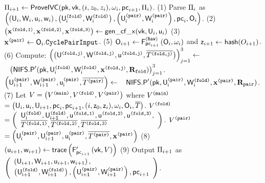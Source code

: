 \begin{small}
\begin{algorithm}[bt]
$ \ivcprf_{i+1} \leftarrow \ProveIVC(\pk, \vk, (i, z_0, z_i), \omega_i, \pc_{i+1}, 
	\ivcprf_i)$. \newline
(1) Parse $\ivcprf_i$ as $\left(
		\left(\U_i, \W_i, \u_i, \w_i\right), 
		\left(\Uc{i}, \Wc{i}\right), 
		\left(\Upair{i}, \Wpair{i}\right),
		\pc_i, \O_i
	\right)$. \newline
(2) $\left(\xin{fold}{1},\xin{fold}{2},\xin{fold}{3}\right) 
		\leftarrow \genCycleFoldX(\vk, \U_i, \u_i) $ \newline
(3) $\xinpair \leftarrow \O_i.\CpInput$. \newline
	\newline
(5) $\O_{i+1} \leftarrow \realfunc{\pc_{i+1}}\left(\O_i, \omega_i\right)$ and
	$\z_{i+1} \leftarrow \hash(O_{i+1})$. \newline
(6) Compute:  \newline
	$\left(\big(\Uce{j},\Wce{j}, \uce{j}, \comCT{j}\big)\right)_{j=1}^3 \leftarrow$ 
	\newline
	$\htab \left(\nifspwrapper(\pk, \Uc{i}, \Wc{i}, \xin{fold}{j}, \cyclefold)\right)_{j=1}^3$.
	\newline
	$\left(\Upair{i+1},\Wpair{i+1}, \upair{i}, \comPT\right) \leftarrow$ 
	\newline
	$\htab \nifspwrapper(\pk, \Upair{i}, \Wc{i}, \xinpair, \cyclepair)$.
	\newline
(7) Let  $\advice = \left(\advicemain, \advicefold, \advicepair\right)$ 
	where
	\newline $\advicemain$ $  =
		\left(\U_i, \u_i, \U_{i+1}, \pc_i, \pc_{i+1}, (i, \z_0, \z_i),  
			\omega_i, \O_i, \overline{T}\right)$.  \newline
		$\advicefold$   $= \left(
				\begin{array}{l}
					\Uc{i}, \Uc{i+1}, \uce{1}, \uce{2}, \uce{3}, \\
					\comCT{1}, \comCT{2}, \comCT{3}
				\end{array}
		  \right).
		$   \newline
	$\advicepair$  	
		$= \left(
		   \Upair{i}, \Upair{i+1}, \upair{i}, \comPT, \xinpair
		  \right)$  \newline
(8) $(\u_{i+1}, \w_{i+1}) \leftarrow \trace\left(\augf{\pc_{i+1}}\left(\vk, \advice\right)\right)$ \newline
(9) Output $\ivcprf_{i+1}$ as $\left(
	\begin{array}{l}
		\left(\U_{i+1}, \W_{i+1}, \u_{i+1}, \w_{i+1}\right), \\
		\left(\Uc{i+1}, \Wc{i+1} \right), 
		\left(\Upair{i+1}, \Wpair{i+1}\right),
		\pc_{i+1}
	\end{array}
	\right)$. \newline


\end{algorithm}
\end{small}

